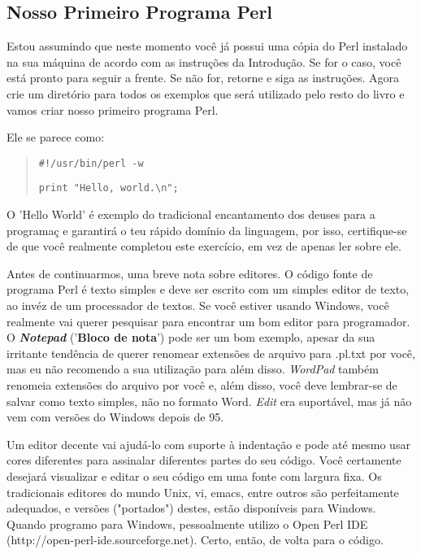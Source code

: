 \documentclass[a4paper,12pt,twoside]{book}
\newenvironment{code}{\begin{quote}}{\end{quote}}
\begin{document}
\subsection{Nosso Primeiro Programa Perl}

\noindent Estou assumindo que neste momento você já possui uma cópia do Perl 
instalado na sua máquina de acordo com as instru\c{c}ões da Introdu\c{c}ão. 
Se for o caso, você está pronto para seguir a frente. Se não for, retorne e 
siga as instru\c{c}ões. Agora crie um diretório para todos os exemplos que 
será utilizado pelo resto do livro e vamos criar nosso primeiro programa Perl.\medskip

\noindent Ele se parece como:

\begin{code}
\texttt{\#!/usr/bin/perl -w}\medskip

\texttt{print "Hello, world.\textbackslash n";}
\end{code}

\noindent O 'Hello World' é exemplo do tradicional encantamento dos deuses para a 
programa\c{c} e garantirá o teu rápido domínio da linguagem, por isso, 
certifique-se de que você realmente completou este exercício, em vez de 
apenas ler sobre ele.\medskip

\noindent Antes de continuarmos, uma breve nota sobre editores. O código 
fonte de programa Perl é texto simples e deve ser escrito com um simples 
editor de texto, ao invéz de um processador de textos. Se você estiver usando 
Windows, você realmente vai querer pesquisar para encontrar um bom editor para 
programador. O \textit{\textbf{Notepad}} ('\textbf{Bloco de nota}') pode ser 
um bom exemplo, apesar da sua irritante tendência de querer renomear extensões 
de arquivo para .pl.txt por você, mas eu não recomendo a sua utilização para 
além disso. \textit{WordPad} também renomeia extensões do arquivo por você e, 
além disso, você deve lembrar-se de salvar como texto simples, não no formato Word. 
\textit{Edit} era suportável, mas já não vem com versões do Windows depois de 95.\medskip

\noindent Um editor decente vai ajudá-lo com suporte à indentação e pode até 
mesmo usar cores diferentes para assinalar diferentes partes do seu código. 
Você certamente desejará visualizar e editar o seu código em uma fonte com 
largura fixa. Os tradicionais editores do mundo Unix, vi, emacs, entre outros 
são perfeitamente adequados, e versões ("portados") destes, estão disponíveis 
para Windows. Quando programo para Windows, pessoalmente utilizo o Open Perl 
IDE (http://open-perl-ide.sourceforge.net). Certo, então, de volta para o código.\medskip
\end{document}
